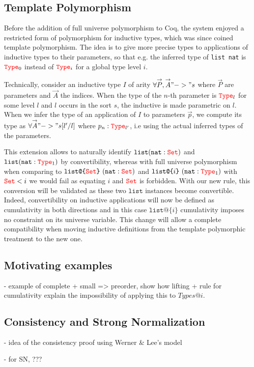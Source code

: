 \documentclass{easychair}
\newcommand{\Type}[1]{{\color{red} \mathtt{Type}}_{#1}}
\newcommand{\Set}{{\color{red} \mathtt{Set}}}
\begin{document}
\def\vec#1{\overset{\rightarrow}{#1}}
\def\clist{\texttt{list}}
\def\nat{\texttt{nat}}
\def\ulist#1{\texttt{list@\{}#1\texttt{\}}}
\subsection*{Template Polymorphism}

Before the addition of full universe polymorphism to Coq, the system
enjoyed a restricted form of polymorphism for inductive types, which was
since coined template polymorphism. The idea is to give more precise
types to applications of inductive types to their parameters, so that
e.g. the inferred type of \texttt{list nat} is $\Type{0}$ instead of
$\Type{i}$ for a global type level $i$.

Technically, consider an inductive type $I$ of arity
$\forall \vec{P}, \vec{A} "->" s$ where $\vec{P}$ are parameters and
$\vec{A}$ the indices.  When the type of the $n$-th parameter is
$\Type{l}$ for some level $l$ and $l$ occurs in the sort $s$, the
inductive is made parametric on $l$. When we infer the type of an
application of $I$ to parameters $\vec{p}$, we compute its type as
$\forall \vec{A} "->" s[l'/l]$ where $p_n : \Type{l'}$, i.e using the
actual inferred types of the parameters.

This extension allows to naturally identify $\clist (\nat : \Set)$ and
$\clist (\nat : \Type{1})$ by convertibility, whereas with full universe
polymorphism when comparing to $\ulist{\Set}~(\nat : \Set)$ and
$\ulist{i}~ (\nat : \Type{1})$ with $\Set < i$ we would fail as equating
$i$ and $\Set$ is forbidden. With our new rule, this conversion will be
validated as these two $\texttt{list}$ instances become convertible.
Indeed, convertibility on inductive applications will now be defined as
cumulativity in both directions and in this case $\ulist{i}$
cumulativity imposes no constraint on its universe variable. This change
will allow a complete compatibility when moving inductive definitions
from the template polymorphic treatment to the new one.

\subsection*{Motivating examples}

- example of complete + small => preorder, show how lifting + rule for
cumulativity explain the impossibility of applying this to $Types@{i}$.

\subsection*{Consistency and Strong Normalization}
- idea of the consistency proof using Werner \& Lee's model

- for SN, ???



\end{document}
